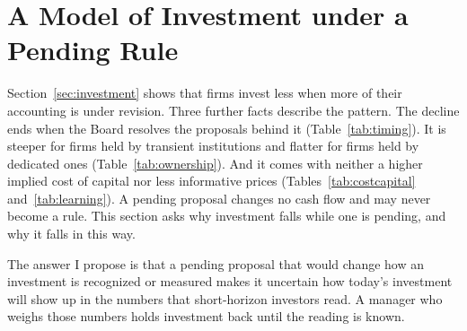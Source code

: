 %
%
%

\section{A Model of Investment under a Pending Rule}\label{sec:model}

Section~\ref{sec:investment} shows that firms invest less when more of their accounting is under revision. Three further facts describe the pattern. The decline ends when the Board resolves the proposals behind it (Table~\ref{tab:timing}). It is steeper for firms held by transient institutions and flatter for firms held by dedicated ones (Table~\ref{tab:ownership}). And it comes with neither a higher implied cost of capital nor less informative prices (Tables~\ref{tab:costcapital} and~\ref{tab:learning}). A pending proposal changes no cash flow and may never become a rule. This section asks why investment falls while one is pending, and why it falls in this way.

The answer I propose is that a pending proposal that would change how an investment is recognized or measured makes it uncertain how today's investment will show up in the numbers that short-horizon investors read. A manager who weighs those numbers holds investment back until the reading is known.

